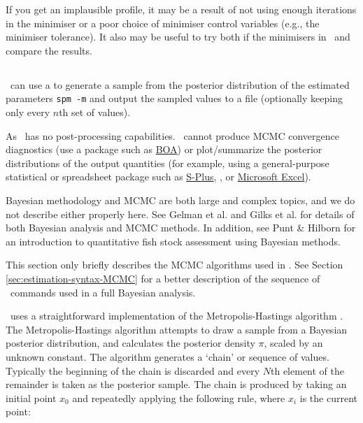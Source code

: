 If you get an implausible profile, it may be a result of not using enough iterations in the minimiser or a poor choice of minimiser control variables (e.g., the minimiser tolerance). It also may be useful to try both if the minimisers in \SPM\ and compare the results.

\subsection{\label{sec:estimate-MCMC}}

\SPM\ can use a  to generate a sample from the posterior distribution of the estimated parameters \texttt{spm -m} and output the sampled values to a file (optionally keeping only every $n$th set of values).

As \SPM\ has no post-processing capabilities. \SPM\ cannot produce MCMC convergence diagnostics (use a package such as \href{http://www.public-health.uiowa.edu/boa}{BOA}) or plot/summarize the posterior distributions of the output quantities (for example, using a general-purpose statistical or spreadsheet package such as \href{http://www.insightful.com}{S-Plus}, \href{http://www.r-project.org}{\R}, or \href{http://www.microsoft.com}{Microsoft Excel}).

Bayesian methodology and MCMC are both large and complex topics, and we do not describe either properly here. See Gelman et al. \citeyearpar{823} and Gilks et al. \citeyearpar{143} for details of both Bayesian analysis and MCMC methods. In addition, see Punt \& Hilborn \citeyearpar{828} for an introduction to quantitative fish stock assessment using Bayesian methods. 

This section only briefly describes the MCMC algorithms used in \SPM. See Section \ref{sec:estimation-syntax-MCMC} for a better description of the sequence of \SPM\ commands used in a full Bayesian analysis.

\SPM\ uses a straightforward implementation of the Metropolis-Hastings algorithm \citep{823,143}. The Metropolis-Hastings algorithm attempts to draw a sample from a Bayesian posterior distribution, and calculates the posterior density $\pi$, scaled by an unknown constant. The algorithm generates a `chain' or sequence of values. Typically the beginning of the chain is discarded and every $N$th element of the remainder is taken as the posterior sample. The chain is produced by taking an initial point $x_0$ and repeatedly applying the following rule, where $x_i$ is the current point: 

